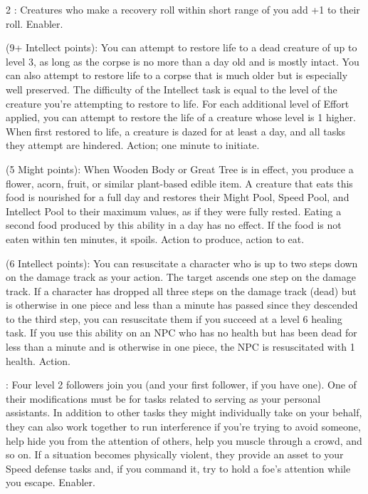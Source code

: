 \begin{multicols}{2}
: Creatures who make a recovery roll within short range of you add +1 to their roll. Enabler. 
 
 (9+ Intellect points): You can attempt to restore life to a dead creature of up to level 3, as long as the corpse is no more than a day old and is mostly intact. You can also attempt to restore life to a corpse that is much older but is especially well preserved. The difficulty of the Intellect task is equal to the level of the creature you’re attempting to restore to life. For each additional level of Effort applied, you can attempt to restore the life of a creature whose level is 1 higher. When first restored to life, a creature is dazed for at least a day, and all tasks they attempt are hindered. Action; one minute to initiate. 

 (5 Might points): When Wooden Body or Great Tree is in effect, you produce a flower, acorn, fruit, or similar plant-based edible item. A creature that eats this food is nourished for a full day and restores their Might Pool, Speed Pool, and Intellect Pool to their maximum values, as if they were fully rested. Eating a second food produced by this ability in a day has no effect. If the food is not eaten within ten minutes, it spoils. Action to produce, action to eat.

 (6 Intellect points): You can resuscitate a character who is up to two steps down on the damage track as your action. The target ascends one step on the damage track. If a character has dropped all three steps on the damage track (dead) but is otherwise in one piece and less than a minute has passed since they descended to the third step, you can resuscitate them if you succeed at a level 6 healing task. If you use this ability on an NPC who has no health but has been dead for less than a minute and is otherwise in one piece, the NPC is resuscitated with 1 health. Action.
 
: Four level 2 followers join you (and your first follower, if you have one). One of their modifications must be for tasks related to serving as your personal assistants. In addition to other tasks they might individually take on your behalf, they can also work together to run interference if you’re trying to avoid someone, help hide you from the attention of others, help you muscle through a crowd, and so on. If a situation becomes physically violent, they provide an asset to your Speed defense tasks and, if you command it, try to hold a foe’s attention while you escape. Enabler. 
 

\end{multicols}
